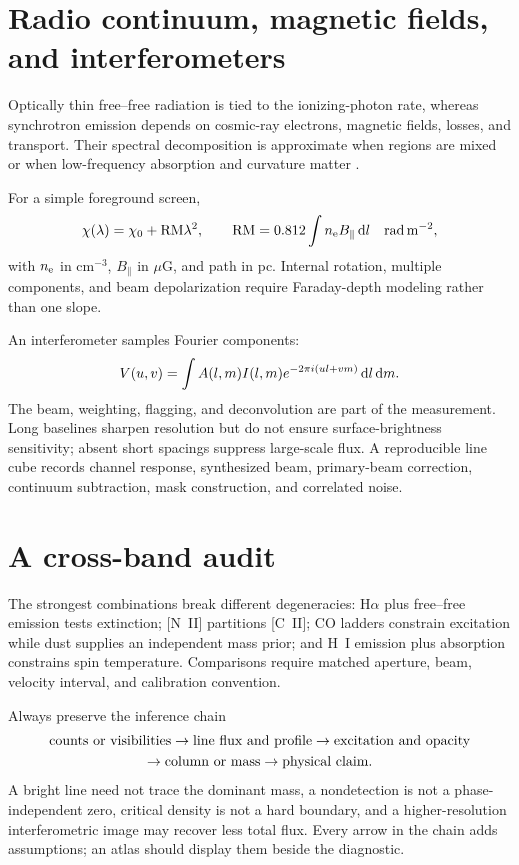 \section{Radio continuum, magnetic fields, and interferometers}

Optically thin free--free radiation is tied to the ionizing-photon rate,
whereas synchrotron emission depends on cosmic-ray electrons, magnetic
fields, losses, and transport. Their spectral decomposition is approximate
when regions are mixed or when low-frequency absorption and curvature matter
\citep{CondonRansom2016,KennicuttEvans2012}.

For a simple foreground screen,
\begin{equation}
 \chi(\lambda)=\chi_0+{\rm RM}\lambda^2,\qquad
 {\rm RM}=0.812\int n_{\rm e}B_\parallel\,{\rm d}l
 \quad {\rm rad\,m^{-2}},
\end{equation}
with $n_{\rm e}$ in cm$^{-3}$, $B_\parallel$ in $\mu$G, and path in pc.
Internal rotation, multiple components, and beam depolarization require
Faraday-depth modeling rather than one slope.

An interferometer samples Fourier components:
\begin{equation}
 V(u,v)=\int A(l,m)I(l,m)e^{-2\pi i(ul+vm)}\,{\rm d}l\,{\rm d}m .
\end{equation}
The beam, weighting, flagging, and deconvolution are part of the measurement.
Long baselines sharpen resolution but do not ensure surface-brightness
sensitivity; absent short spacings suppress large-scale flux. A reproducible
line cube records channel response, synthesized beam, primary-beam correction,
continuum subtraction, mask construction, and correlated noise.

\section{A cross-band audit}

The strongest combinations break different degeneracies: H$\alpha$ plus
free--free emission tests extinction; [N~II] partitions [C~II]; CO ladders
constrain excitation while dust supplies an independent mass prior; and H~I
emission plus absorption constrains spin temperature. Comparisons require
matched aperture, beam, velocity interval, and calibration convention.

Always preserve the inference chain
\[
 \begin{gathered}
 \hbox{counts or visibilities}\rightarrow\hbox{line flux and profile}
 \rightarrow\hbox{excitation and opacity}\\
 \rightarrow\hbox{column or mass}\rightarrow\hbox{physical claim}.
 \end{gathered}
\]
A bright line need not trace the dominant mass, a nondetection is not a
phase-independent zero, critical density is not a hard boundary, and a
higher-resolution interferometric image may recover less total flux. Every
arrow in the chain adds assumptions; an atlas should display them beside the
diagnostic.
